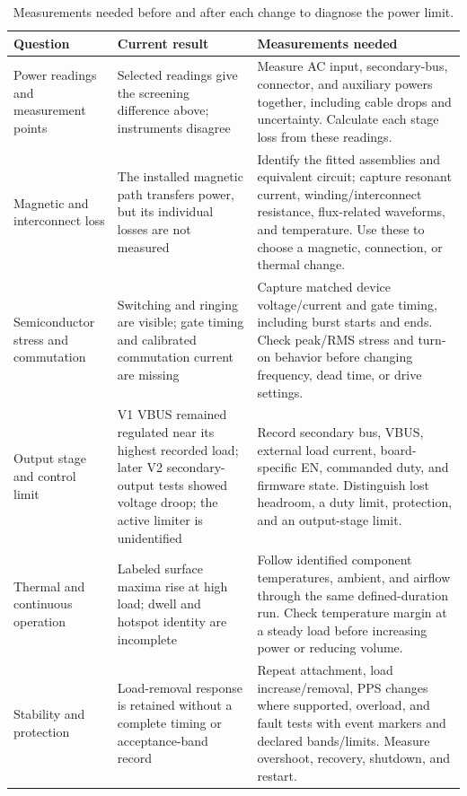 \begin{table}[htbp]
\centering
\caption[Measurements for diagnosing the power limit.]{Measurements needed before and after each change to diagnose the power limit.}
\label{tab:plan-gap-diagnostic-matrix}
\small
\begin{tabularx}{\textwidth}{@{}L{0.20\textwidth}L{0.26\textwidth}Y@{}}
\toprule
Question & Current result & Measurements needed\\
\midrule
Power readings and measurement points & Selected readings give the screening difference above; instruments disagree & Measure AC input, secondary-bus, connector, and auxiliary powers together, including cable drops and uncertainty. Calculate each stage loss from these readings.\\
Magnetic and interconnect loss & The installed magnetic path transfers power, but its individual losses are not measured & Identify the fitted assemblies and equivalent circuit; capture resonant current, winding/interconnect resistance, flux-related waveforms, and temperature. Use these to choose a magnetic, connection, or thermal change.\\
Semiconductor stress and commutation & Switching and ringing are visible; gate timing and calibrated commutation current are missing & Capture matched device voltage/current and gate timing, including burst starts and ends. Check peak/RMS stress and turn-on behavior before changing frequency, dead time, or drive settings.\\
Output stage and control limit & V1 VBUS remained regulated near its highest recorded load; later V2 secondary-output tests showed voltage droop; the active limiter is unidentified & Record secondary bus, VBUS, external load current, board-specific EN, commanded duty, and firmware state. Distinguish lost headroom, a duty limit, protection, and an output-stage limit.\\
Thermal and continuous operation & Labeled surface maxima rise at high load; dwell and hotspot identity are incomplete & Follow identified component temperatures, ambient, and airflow through the same defined-duration run. Check temperature margin at a steady load before increasing power or reducing volume.\\
Stability and protection & Load-removal response is retained without a complete timing or acceptance-band record & Repeat attachment, load increase/removal, PPS changes where supported, overload, and fault tests with event markers and declared bands/limits. Measure overshoot, recovery, shutdown, and restart.\\
\bottomrule
\end{tabularx}
\end{table}
\FloatBarrier

